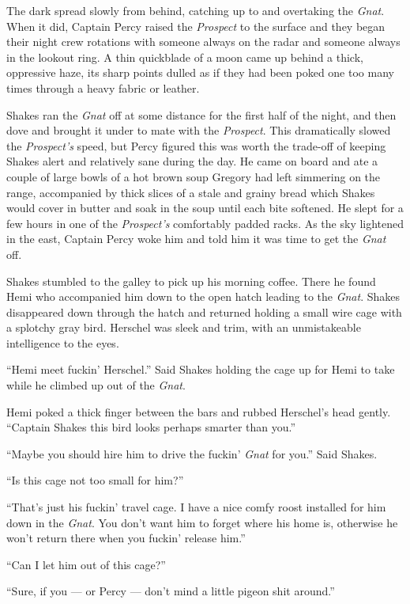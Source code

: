 \documentclass[]{scrbook}
\begin{document}
The dark spread slowly from behind, catching up to and overtaking the
\emph{Gnat}. When it did, Captain Percy raised the \emph{Prospect} to
the surface and they began their night crew rotations with someone
always on the radar and someone always in the lookout ring. A thin
quickblade of a moon came up behind a thick, oppressive haze, its sharp
points dulled as if they had been poked one too many times through a
heavy fabric or leather.

Shakes ran the \emph{Gnat} off at some distance for the first half of
the night, and then dove and brought it under to mate with the
\emph{Prospect}. This dramatically slowed the \emph{Prospect's} speed,
but Percy figured this was worth the trade-off of keeping Shakes alert
and relatively sane during the day. He came on board and ate a couple of
large bowls of a hot brown soup Gregory had left simmering on the range,
accompanied by thick slices of a stale and grainy bread which Shakes
would cover in butter and soak in the soup until each bite softened. He
slept for a few hours in one of the \emph{Prospect's} comfortably padded
racks. As the sky lightened in the east, Captain Percy woke him and told
him it was time to get the \emph{Gnat} off.

Shakes stumbled to the galley to pick up his morning coffee. There he
found Hemi who accompanied him down to the open hatch leading to the
\emph{Gnat}. Shakes disappeared down through the hatch and returned
holding a small wire cage with a splotchy gray bird. Herschel was sleek
and trim, with an unmistakeable intelligence to the eyes.

``Hemi meet fuckin' Herschel.'' Said Shakes holding the cage up for Hemi
to take while he climbed up out of the \emph{Gnat}.

Hemi poked a thick finger between the bars and rubbed Herschel's head
gently. ``Captain Shakes this bird looks perhaps smarter than you.''

``Maybe you should hire him to drive the fuckin' \emph{Gnat} for you.''
Said Shakes.

``Is this cage not too small for him?''

``That's just his fuckin' travel cage. I have a nice comfy roost
installed for him down in the \emph{Gnat}. You don't want him to forget
where his home is, otherwise he won't return there when you fuckin'
release him.''

``Can I let him out of this cage?''

``Sure, if you --- or Percy --- don't mind a little pigeon shit
around.''
\end{document}
